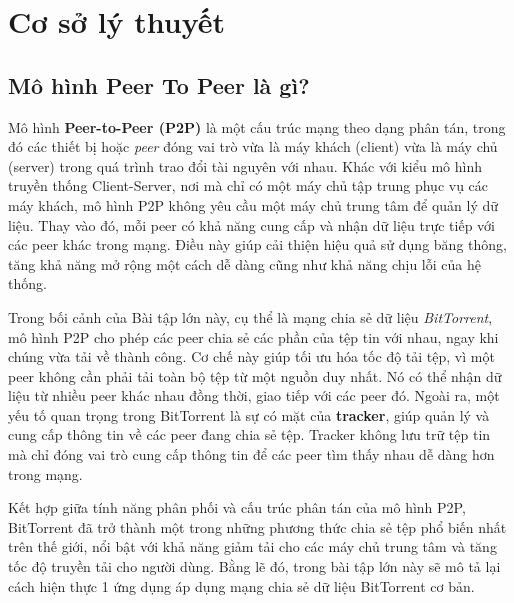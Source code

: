 \section{Cơ sở lý thuyết}
\subsection{Mô hình Peer To Peer là gì?}
Mô hình \textbf{Peer-to-Peer (P2P)} là một cấu trúc mạng theo dạng phân tán, trong đó các thiết bị hoặc \textit{peer} đóng vai trò vừa là máy khách (client) vừa là máy chủ (server) trong quá trình trao đổi tài nguyên với nhau. Khác với kiểu mô hình truyền thống Client-Server, nơi mà chỉ có một máy chủ tập trung phục vụ các máy khách, mô hình P2P
không yêu cầu một máy chủ trung tâm để quản lý dữ liệu.
Thay vào đó, mỗi peer có khả năng cung cấp và nhận dữ liệu trực tiếp với các peer khác trong mạng. Điều này giúp cải thiện hiệu quả sử dụng băng thông, tăng khả năng mở rộng một cách dễ dàng cũng như khả năng chịu lỗi của hệ thống.

Trong bối cảnh của Bài tập lớn này, cụ thể là mạng chia sẻ dữ liệu \textit{BitTorrent}, mô hình P2P cho phép các peer chia sẻ các phần của tệp tin với nhau, ngay khi chúng vừa tải về thành công. Cơ chế này giúp tối ưu hóa tốc độ tải tệp, vì một peer không cần phải tải toàn bộ tệp từ một nguồn duy nhất.
Nó có thể nhận dữ liệu từ nhiều peer khác nhau đồng thời, giao tiếp với các peer đó. Ngoài ra, một yếu tố quan trọng trong BitTorrent là sự có mặt của \textbf{tracker}, giúp quản lý và cung cấp thông tin về các peer đang chia sẻ tệp.
Tracker không lưu trữ tệp tin mà chỉ đóng vai trò cung cấp thông tin để các peer tìm thấy nhau dễ dàng hơn trong mạng.

Kết hợp giữa tính năng phân phối và cấu trúc phân tán của mô hình P2P, BitTorrent đã trở thành một trong những phương thức chia sẻ tệp phổ biến nhất trên thế giới, nổi bật với khả năng giảm tải cho các máy chủ trung tâm và tăng tốc độ truyền tải cho người dùng. Bằng lẽ đó, trong bài tập lớn này sẽ mô tả lại cách hiện thực 
1 ứng dụng áp dụng mạng chia sẻ dữ liệu BitTorrent cơ bản.


